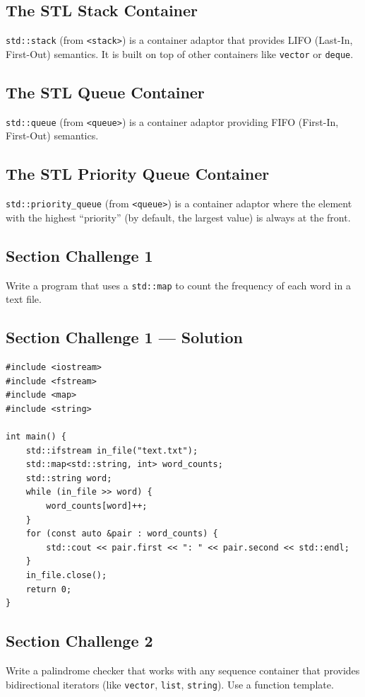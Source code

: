 \subsection{The STL Stack Container}
\texttt{std::stack} (from \texttt{<stack>}) is a container adaptor that provides LIFO (Last-In, First-Out) semantics. It is built on top of other containers like \texttt{vector} or \texttt{deque}.

\subsection{The STL Queue Container}
\texttt{std::queue} (from \texttt{<queue>}) is a container adaptor providing FIFO (First-In, First-Out) semantics.

\subsection{The STL Priority Queue Container}
\texttt{std::priority\_queue} (from \texttt{<queue>}) is a container adaptor where the element with the highest ``priority'' (by default, the largest value) is always at the front.

\subsection{Section Challenge 1}
Write a program that uses a \texttt{std::map} to count the frequency of each word in a text file.

\subsection{Section Challenge 1 --- Solution}
\begin{lstlisting}
#include <iostream>
#include <fstream>
#include <map>
#include <string>

int main() {
	std::ifstream in_file("text.txt");
	std::map<std::string, int> word_counts;
	std::string word;
	while (in_file >> word) {
		word_counts[word]++;
	}
	for (const auto &pair : word_counts) {
		std::cout << pair.first << ": " << pair.second << std::endl;
	}
	in_file.close();
	return 0;
}
\end{lstlisting}

\subsection{Section Challenge 2}
Write a palindrome checker that works with any sequence container that provides bidirectional iterators (like \texttt{vector}, \texttt{list}, \texttt{string}). Use a function template.

